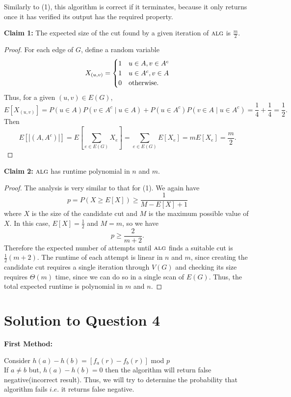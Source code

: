 \documentclass[11pt]{article}
\newcommand{\alg}{\textsc{alg}}
\begin{document}
\begin{enumerate}[(1)]
    Similarly to (1), this algorithm is correct if it terminates, because it only returns once it has verified its output has the required property.

    {\bf Claim 1:} The expected size of the cut found by a given iteration of $\alg$ is $\frac{m}{2}$.

    \begin{proof}
      For each edge of $G$, define a random variable \[X_{(u,v)} = \begin{cases}1 & u \in A, v \in A^c\\ 1 & u \in A^c, v \in A\\ 0 & \textnormal{otherwise}.\end{cases}\]
      Thus, for a given $(u,v) \in E(G)$, \[E[X_{(u,v)}] = P(u \in A)P(v \in A^c \mid u \in A) + P(u \in A^c)P(v \in A \mid u \in A^c) = \frac{1}{4} + \frac{1}{4} = \frac{1}{2}.\]
      Then \[E\left[|(A, A^c)|\right] = E\left[\sum_{e \in E(G)} X_e\right] = \sum_{e \in E(G)}E[X_e] = mE[X_e] = \frac{m}{2}.\]
    \end{proof}

    {\bf Claim 2:} $\alg$ has runtime polynomial in $n$ and $m$.
    \begin{proof}
      The analysis is very similar to that for (1).
      We again have \[p = P(X \geq E[X]) \geq \frac{1}{M - E[X] + 1}\] where $X$ is the size of the candidate cut and $M$ is the maximum possible value of $X$.
      In this case, $E[X] = \frac{1}{2}$ and $M = m$, so we have \[p \geq \frac{2}{m+2}.\]
      Therefore the expected number of attempts until $\alg$ finds a suitable cut is $\frac{1}{2}(m+2)$.
      The runtime of each attempt is linear in $n$ and $m$, since creating the candidate cut requires a single iteration through $V(G)$ and checking its size requires $\Theta(m)$ time, since we can do so in a single scan of $E(G)$.
      Thus, the total expected runtime is polynomial in $m$ and $n$.
    \end{proof}
\end{enumerate}

\newpage

\section{Solution to Question 4}

\textbf{First Method:}

Consider $h(a) - h(b) = [f_a(r) - f_b(r)]$ mod $p$ \\
If $a \neq b$ but, $h(a) - h(b) = 0$ then the algorithm will return false negative(incorrect result). Thus, we will try to determine
the probability that algorithm fails $i.e.$ it returns false negative.
\end{document}
